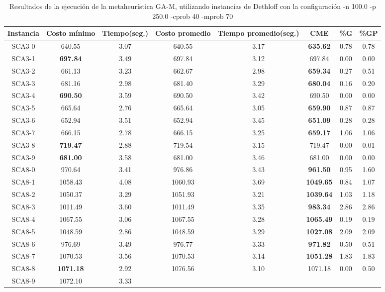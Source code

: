 \begin{table}[ht]
\caption{Resultados de la ejecución de la metaheurística GA-M, utilizando instancias de Dethloff con la configuración -n 100.0 -p 250.0 -cprob 40 -mprob 70}
\centering
\small
\begin{tabular}{c c c c c c c c}
\hline\hline
Instancia & Costo mínimo & Tiempo(seg.) & Costo promedio & Tiempo promedio(seg.) & CME & \%G & \%GP \\ [0.5ex]
\hline
SCA3-0 & 640.55 & 3.07 & 
640.55 & 3.17 & \bf{635.62} & 
0.78 & 0.78\\SCA3-1 & \bf{697.84} & 3.49 & 
697.84 & 3.12 & 697.84 & 0.00
 & 0.00\\
SCA3-2 & 661.13 & 3.23 & 
662.67 & 2.98 & \bf{659.34} & 
0.27 & 0.51\\SCA3-3 & 681.16 & 2.98 & 
681.40 & 3.29 & \bf{680.04} & 
0.16 & 0.20\\SCA3-4 & \bf{690.50} & 3.59 & 
690.50 & 3.42 & 690.50 & 0.00
 & 0.00\\
SCA3-5 & 665.64 & 2.76 & 
665.64 & 3.05 & \bf{659.90} & 
0.87 & 0.87\\SCA3-6 & 652.94 & 3.51 & 
652.94 & 3.45 & \bf{651.09} & 
0.28 & 0.28\\SCA3-7 & 666.15 & 2.78 & 
666.15 & 3.25 & \bf{659.17} & 
1.06 & 1.06\\SCA3-8 & \bf{719.47} & 2.88 & 
719.54 & 3.15 & 719.47 & 0.00
 & 0.01\\SCA3-9 & \bf{681.00} & 3.58 & 
681.00 & 3.46 & 681.00 & 0.00
 & 0.00\\
SCA8-0 & 970.64 & 3.41 & 
976.86 & 3.43 & \bf{961.50} & 
0.95 & 1.60\\SCA8-1 & 1058.43 & 4.08 & 
1060.93 & 3.69 & \bf{1049.65} & 
0.84 & 1.07\\SCA8-2 & 1050.37 & 3.29 & 
1051.93 & 3.21 & \bf{1039.64} & 
1.03 & 1.18\\SCA8-3 & 1011.49 & 3.60 & 
1011.49 & 3.35 & \bf{983.34} & 
2.86 & 2.86\\SCA8-4 & 1067.55 & 3.06 & 
1067.55 & 3.28 & \bf{1065.49} & 
0.19 & 0.19\\SCA8-5 & 1048.59 & 2.86 & 
1048.59 & 3.29 & \bf{1027.08} & 
2.09 & 2.09\\SCA8-6 & 976.69 & 3.49 & 
976.77 & 3.33 & \bf{971.82} & 
0.50 & 0.51\\SCA8-7 & 1070.53 & 3.56 & 
1070.53 & 3.14 & \bf{1051.28} & 
1.83 & 1.83\\SCA8-8 & \bf{1071.18} & 2.92 & 
1076.56 & 3.10 & 1071.18 & 0.00
 & 0.50\\SCA8-9 & 1072.10 & 3.33 & 

\end{tabular}
\end{table}
